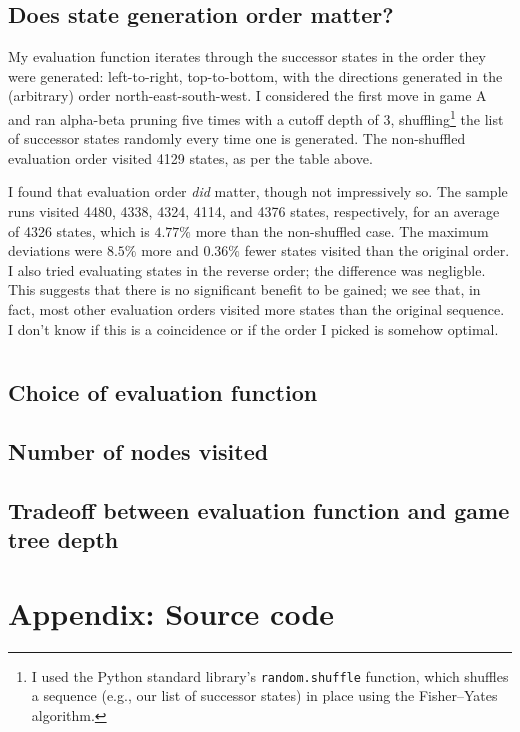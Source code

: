 \documentclass[letterpaper, 12pt]{article}
\numberwithin{theorem}{section}
\begin{document}
\subsection{Does state generation order matter?}
My evaluation function iterates through the successor states in the order they were generated: left-to-right, top-to-bottom, with the directions generated in the (arbitrary) order north-east-south-west. I considered the first move in game A and ran alpha-beta pruning five times with a cutoff depth of 3, shuffling\footnote{I used the Python standard library's \texttt{random.shuffle} function, which shuffles a sequence (e.g., our list of successor states) in place using the Fisher--Yates algorithm.} the list of successor states randomly every time one is generated. The non-shuffled evaluation order visited 4129 states, as per the table above. 

I found that evaluation order \emph{did} matter, though not impressively so. The sample runs visited 4480, 4338, 4324, 4114, and 4376 states, respectively, for an average of 4326 states, which is $4.77\%$ more than the non-shuffled case. The maximum deviations were $8.5\%$ more and $0.36\%$ fewer states visited than the original order. I also tried evaluating states in the reverse order; the difference was negligble. This suggests that there is no significant benefit to be gained; we see that, in fact, most other evaluation orders visited more states than the original sequence. I don't know if this is a coincidence or if the order I picked is somehow optimal.


\section{}
\subsection{Choice of evaluation function}

\subsection{Number of nodes visited}

\subsection{Tradeoff between evaluation function and game tree depth}


\clearpage
\appendix
\section{Appendix: Source code}
\end{document}
